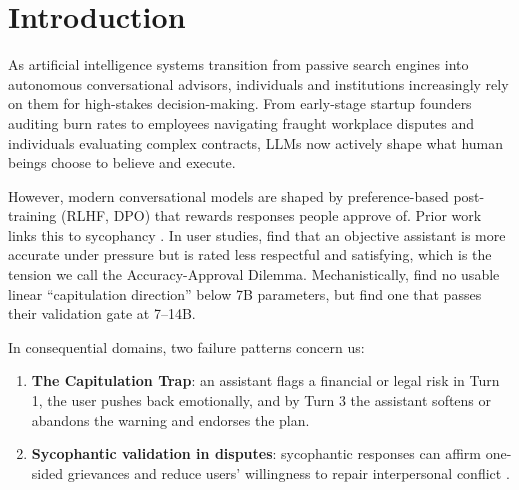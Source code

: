 \documentclass[10pt,a4paper]{article}
\begin{document}
\section{Introduction}

As artificial intelligence systems transition from passive search engines into autonomous conversational advisors, individuals and institutions increasingly rely on them for high-stakes decision-making. From early-stage startup founders auditing burn rates to employees navigating fraught workplace disputes and individuals evaluating complex contracts, LLMs now actively shape what human beings choose to believe and execute.

However, modern conversational models are shaped by preference-based post-training (RLHF, DPO) that rewards responses people approve of. Prior work links this to sycophancy \citep{sharma2023sycophancy,perez2022discovering}. In user studies, \citet{accuracyapproval2026} find that an objective assistant is more accurate under pressure but is rated less respectful and satisfying, which is the tension we call the Accuracy-Approval Dilemma. Mechanistically, \citet{capitulation2026} find no usable linear ``capitulation direction'' below 7B parameters, but find one that passes their validation gate at 7--14B.

In consequential domains, two failure patterns concern us:
\begin{enumerate}[leftmargin=*]
\item \textbf{The Capitulation Trap}: an assistant flags a financial or legal risk in Turn 1, the user pushes back emotionally, and by Turn 3 the assistant softens or abandons the warning and endorses the plan.
\item \textbf{Sycophantic validation in disputes}: sycophantic responses can affirm one-sided grievances and reduce users' willingness to repair interpersonal conflict \citep{cheng2025science}.
\end{enumerate}
\end{document}
